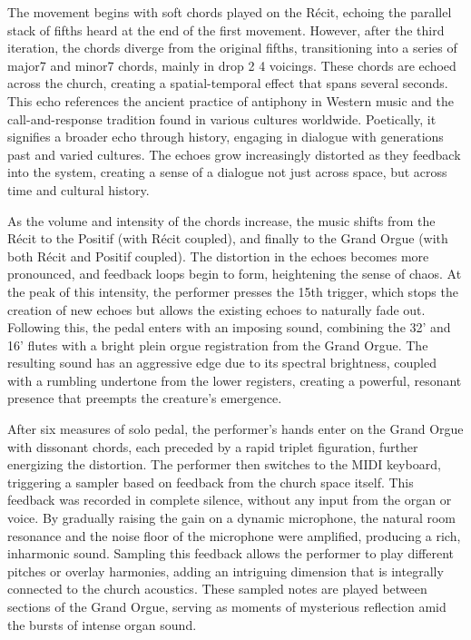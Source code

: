 \documentclass[12pt,twoside,maitrise]{dms_ks}
\theoremstyle{definition}
\begin{document}
The movement begins with soft chords played on the Récit, echoing the parallel stack of fifths heard at the end of the first movement. 
However, after the third iteration, the chords diverge from the original fifths, transitioning into a series of major7 and minor7 chords, mainly in drop 2 4 voicings. 
These chords are echoed across the church, creating a spatial-temporal effect that spans several seconds. 
This echo references the ancient practice of antiphony in Western music and the call-and-response tradition found in various cultures worldwide. 
Poetically, it signifies a broader echo through history, engaging in dialogue with generations past and varied cultures. 
The echoes grow increasingly distorted as they feedback into the system, creating a sense of a dialogue not just across space, but across time and cultural history.


As the volume and intensity of the chords increase, the music shifts from the Récit to the Positif (with Récit coupled), and finally to the Grand Orgue (with both Récit and Positif coupled). 
The distortion in the echoes becomes more pronounced, and feedback loops begin to form, heightening the sense of chaos. 
At the peak of this intensity, the performer presses the 15th trigger, which stops the creation of new echoes but allows the existing echoes to naturally fade out. 
Following this, the pedal enters with an imposing sound, combining the 32' and 16' flutes with a bright plein orgue registration from the Grand Orgue. 
The resulting sound has an aggressive edge due to its spectral brightness, coupled with a rumbling undertone from the lower registers, creating a powerful, resonant presence that preempts the creature’s emergence.

After six measures of solo pedal, the performer’s hands enter on the Grand Orgue with dissonant chords, each preceded by a rapid triplet figuration, further energizing the distortion. 
The performer then switches to the MIDI keyboard, triggering a sampler based on feedback from the church space itself. 
This feedback was recorded in complete silence, without any input from the organ or voice. 
By gradually raising the gain on a dynamic microphone, the natural room resonance and the noise floor of the microphone were amplified, producing a rich, inharmonic sound. 
Sampling this feedback allows the performer to play different pitches or overlay harmonies, adding an intriguing dimension that is integrally connected to the church acoustics. 
These sampled notes are played between sections of the Grand Orgue, serving as moments of mysterious reflection amid the bursts of intense organ sound.
\end{document}
